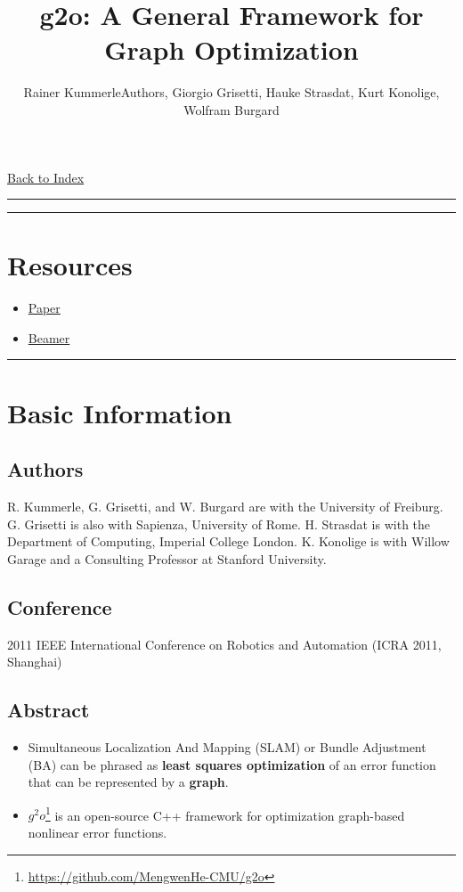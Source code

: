 \documentclass[letterpaper,10pt]{article}
\title{\textbf{g2o: A General Framework for Graph Optimization}}
\author{Rainer KummerleAuthors, Giorgio Grisetti, Hauke Strasdat, Kurt Konolige, Wolfram Burgard}
\begin{document}
	
\maketitle

\href{../index.html}{Back to Index}
\begin{center}\rule{\textwidth}{1pt}\end{center}

\tableofcontents

\begin{center}\rule{\textwidth}{1pt}\end{center}
\section{Resources}

\begin{itemize}
	\item \href{./paper.pdf}{Paper}
	\item \href{./beamer.pdf}{Beamer}
\end{itemize}

\begin{center}\rule{\textwidth}{1pt}\end{center}
\section{Basic Information}

\subsection{Authors}
R. Kummerle, G. Grisetti, and W. Burgard are with the University
of Freiburg. G. Grisetti is also with Sapienza, University of Rome. H. Strasdat is with the Department of Computing, Imperial College London. K. Konolige is with Willow Garage and a Consulting Professor at Stanford University.

\subsection{Conference}

2011 IEEE International Conference on Robotics and Automation (ICRA 2011, Shanghai)

\subsection{Abstract}
\begin{itemize}
	\item Simultaneous Localization And Mapping (SLAM) or Bundle Adjustment (BA) can be phrased as \textbf{least squares optimization} of an error function that can be represented by a \textbf{graph}.
	\item $g^2o$\footnote{\url{https://github.com/MengwenHe-CMU/g2o}} is an open-source C++ framework for optimization graph-based nonlinear error functions.
\end{itemize}
\end{document}
